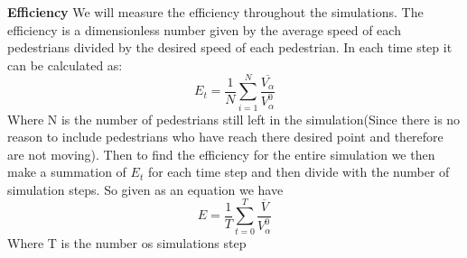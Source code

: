  \textbf{Efficiency}
	We will measure the efficiency throughout the simulations. The efficiency is a dimensionless number given by the average speed of each pedestrians divided by the desired speed of each pedestrian. In each time step it can be calculated as:
	\begin{equation}
		E_t=\frac{1}{N}\sum_{i=1}^{N}\frac{\overline{V_{\alpha}}}{V^0_{\alpha}}
	\end{equation}
	Where N is the number of pedestrians still left in the simulation(Since there is no reason to include pedestrians who have reach there desired point and therefore are not moving). 
	Then to find the efficiency for the entire simulation we then make a summation of $E_t$ for each time step and then divide with the number of simulation steps. So given as an equation we have
	\begin{equation}
		E=\frac{1}{T}\sum_{t=0}^{T}\frac{\overline{V}}{V^0_{\alpha}}
	\end{equation}
	Where T is the number os simulations step 



